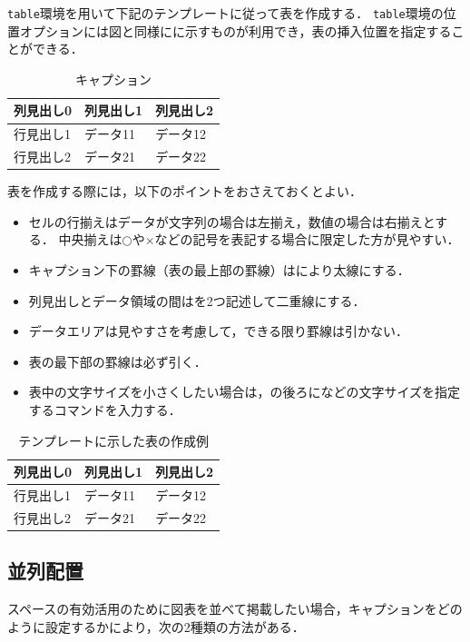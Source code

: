 \documentclass[a4j,11pt]{ujreport}
\begin{document}
\texttt{table}環境を用いて下記のテンプレートに従って表を作成する．
\texttt{table}環境の位置オプションには図と同様にに示すものが利用でき，表の挿入位置を指定することができる．

\begin{code}
\begin{table}[位置]
	\centering 
	\caption{キャプション}
	\label{tab:ラベル}
	\small	%
	\begin{tabular}{l|ll}
		\Hline 
		列見出し0 & 列見出し1 & 列見出し2\\ 
		\hline\hline
		行見出し1 & データ11 & データ12\\
		行見出し2 & データ21 & データ22\\
		\hline 
	\end{tabular} 
\end{table}
\end{code}%

表を作成する際には，以下のポイントをおさえておくとよい．
\begin{itemize}
\item セルの行揃えはデータが文字列の場合は左揃え，数値の場合は右揃えとする．
中央揃えは$\bigcirc$や$\times$などの記号を表記する場合に限定した方が見やすい．
\item キャプション下の罫線（表の最上部の罫線）はにより太線にする．
\item 列見出しとデータ領域の間はを2つ記述して二重線にする．
\item データエリアは見やすさを考慮して，できる限り罫線は引かない．
\item 表の最下部の罫線は必ず引く．
\item 表中の文字サイズを小さくしたい場合は，の後ろになどの文字サイズを指定するコマンドを入力する．
\end{itemize}

\begin{table}[ht]
	\centering
	\caption{テンプレートに示した表の作成例}
	\label{tab:ExampleTable}
	\small
	\begin{tabular}{l|ll}
		\Hline 
		列見出し0 & 列見出し1 & 列見出し2\\ 
		\hline\hline
		行見出し1 & データ11 & データ12\\
		行見出し2 & データ21 & データ22\\
		\hline 
	\end{tabular} 
\end{table}

\subsection{並列配置}
スペースの有効活用のために図表を並べて掲載したい場合，キャプションをどのように設定するかにより，次の2種類の方法がある．
\end{document}

